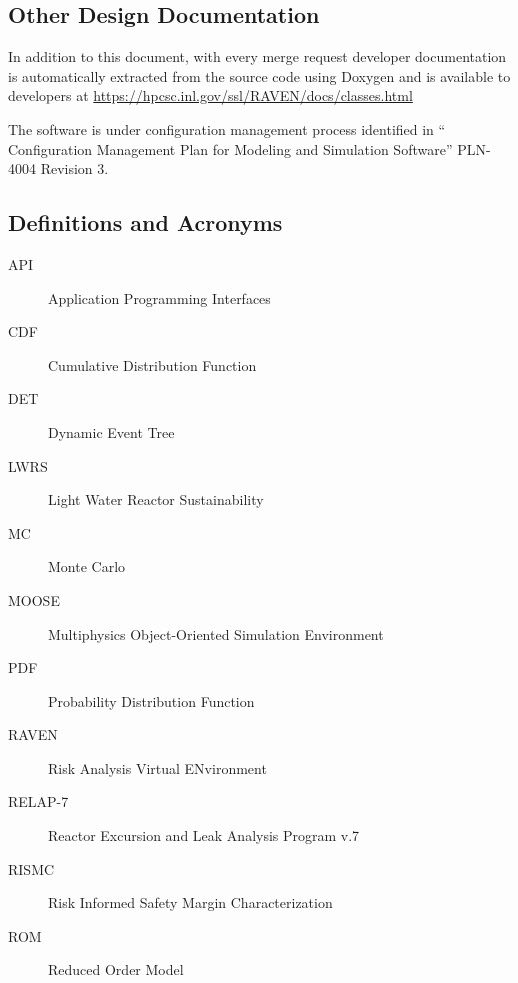 \subsection{Other Design Documentation}

In addition to this document, with every merge request developer
documentation is automatically extracted from the source code using
Doxygen and is available to developers at
\url{https://hpcsc.inl.gov/ssl/RAVEN/docs/classes.html}

The software is under configuration management process identified in
`` Configuration Management Plan for Modeling and Simulation
Software'' PLN-4004 Revision 3.

\subsection{Definitions and Acronyms}

\begin{description}
\item[API] Application Programming Interfaces
\item[CDF] Cumulative Distribution Function
\item[DET] Dynamic Event Tree
\item[LWRS] Light Water Reactor Sustainability
\item[MC] Monte Carlo
\item[MOOSE] Multiphysics Object-Oriented Simulation Environment
\item[PDF] Probability Distribution Function
\item[RAVEN] Risk Analysis Virtual ENvironment
\item[RELAP-7] Reactor Excursion and Leak Analysis Program v.7
\item[RISMC] Risk Informed Safety Margin Characterization
\item[ROM] Reduced Order Model
\end{description}
